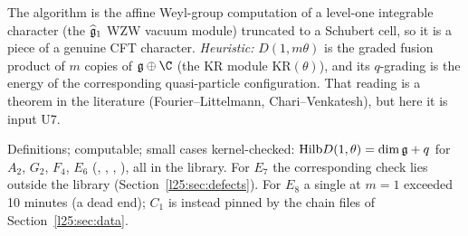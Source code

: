 \begin{physics}
The algorithm is the affine Weyl-group computation of a level-one integrable character (the $\widehat{\mathfrak g}_1$
WZW vacuum module) truncated to a Schubert cell, so it is a piece of a genuine CFT character. \emph{Heuristic:}
$D(1,m\theta)$ is the graded fusion product of $m$ copies of $\ltwentyfiveg\oplus\C$ (the KR module
$\mathrm{KR}(\theta)$), and its $q$-grading is the energy of the corresponding quasi-particle configuration. That reading
is a theorem in the literature (Fourier--Littelmann, Chari--Venkatesh), but here it is input U7.
\end{physics}
\begin{status}
Definitions; computable; small cases kernel-checked: $\mathrm{Hilb}D(1,\theta)=\dim\mathfrak g+q$ for $A_2$, $G_2$,
$F_4$, $E_6$ (, , ,
), all in the library. For $E_7$ the corresponding check lies outside the library
(Section~\ref{l25:sec:defects}). For $E_8$ a single  at $m=1$ exceeded 10 minutes (a dead end); $C_1$ is
instead pinned by the chain files of Section~\ref{l25:sec:data}.
\end{status}

